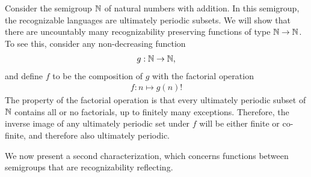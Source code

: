 \begin{myexample}
    Consider the semigroup ${\mathbb N}$ of natural numbers with addition. In this semigroup, the recognizable languages are ultimately periodic subsets.  We will show that there are uncountably many recognizability preserving functions of type ${\mathbb N} \to {\mathbb N}$.
    To see this, consider any  non-decreasing function 
    \begin{align*}
    g : {\mathbb N} \to {\mathbb N},
    \end{align*}
    and define $f$ to be the composition of $g$ with the factorial operation
    \begin{align*}
    f : n \mapsto g(n)!
    \end{align*}
    The property of the factorial operation is that every ultimately periodic subset of ${\mathbb N}$ contains all or no factorials, up to finitely many exceptions. Therefore, the inverse image of any ultimately periodic set under $f$ will be either finite or co-finite, and therefore also ultimately periodic.
\end{myexample}


We now present a second characterization, which concerns functions between semigroups that are recognizability reflecting.

